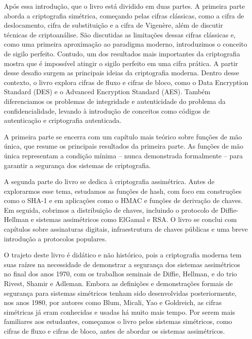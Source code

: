 Após essa introdução, que o livro está dividido em duas partes.
A primeira parte aborda a criptografia simétrica, começando pelas cifras clássicas, como a cifra de deslocamento, cifra de substituição e a cifra de Vigenère, além de discutir técnicas de criptoanálise.
São discutidas as limitações dessas cifras clássicas e, como uma primeira aproximação ao paradigma moderno, introduzimos o conceito de sigilo perfeito.
Contudo, um dos resultados mais importantes da criptografia mostra que é impossível atingir o sigilo perfeito em uma cifra prática.
A partir desse desafio surgem as principais ideias da criptografia moderna.
Dentro desse contexto, o livro explora cifras de fluxo e cifras de bloco, como o Data Encryption Standard (DES) e o Advanced Encryption Standard (AES).
Também diferenciamos os problemas de integridade e autenticidade do problema da confidencialidade, levando à introdução de conceitos como códigos de autenticação e criptografia autenticada.

A primeira parte se encerra com um capítulo mais teórico sobre funções de mão única, que resume os principais resultados da primeira parte.
As funções de mão única representam a condição mínima -- nunca demonstrada formalmente -- para garantir a segurança dos sistemas de criptografia.

A segunda parte do livro se dedica à criptografia assimétrica.
Antes de explorarmos esse tema, estudamos as funções de hash, com foco em construções como o SHA-1 e em aplicações como o HMAC e funções de derivação de chaves.
Em seguida, cobrimos a distribuição de chaves, incluindo o protocolo de Diffie-Hellman e sistemas assimétricos como ElGamal e RSA.
O livro se conclui com capítulos sobre assinaturas digitais, infraestrutura de chaves públicas e uma breve introdução a protocolos populares.

O trajeto deste livro é didático e não histórico, pois a criptografia moderna tem suas raízes na necessidade de demonstrar a segurança dos sistemas assimétricos no final dos anos 1970, com os trabalhos seminais de Diffie, Hellman, e do trio Rivest, Shamir e Adleman.
Embora as definições e demonstrações formais de segurança para sistemas simétricos tenham sido desenvolvidas posteriormente, nos anos 1980, por autores como Blum, Micali, Yao e Goldreich, as cifras simétricas já eram conhecidas e usadas há muito mais tempo.
Por serem mais familiares aos estudantes, começamos o livro pelos sistemas simétricos, como cifras de fluxo e cifras de bloco, antes de abordar os sistemas assimétricos.

